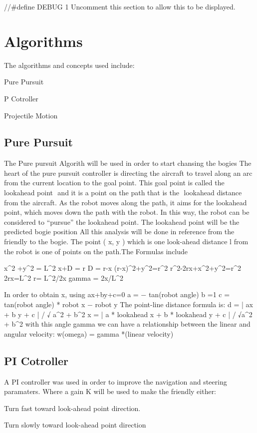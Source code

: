 \begin{DoxyVerb}//#define DEBUG 1
Uncomment this section to allow this to be displayed.\end{DoxyVerb}
\hypertarget{index_Algorithms}{}\section{Algorithms}\label{index_Algorithms}
The algorithms and concepts used include\+:
\begin{DoxyItemize}
\item Pure Pursuit
\item P Cotroller
\item Projectile Motion
\end{DoxyItemize}\hypertarget{index_ac_doc_}{}\subsection{Pure Pursuit}\label{index_ac_doc_}
The Pure pursuit Algorith will be used in order to start chansing the bogies The heart of the pure pursuit controller is directing the aircraft to travel along an arc from the current location to the goal point. This goal point is called the ​ lookahead point ​ and it is a point on the path that is the ​ lookahead distance from the aircraft. As the robot moves along the path, it aims for the lookahead point, which moves down the path with the robot. In this way, the robot can be considered to “pursue” the lookahead point. The lookahead point will be the predicted bogie position All this analysis will be done in reference from the friendly to the bogie. The point ( x, y ) which is one look-\/ahead distance l from the robot is one of points on the path.\+The Formulas include \begin{DoxyVerb}  x^2 +y^2 = L^2
  x+D = r
  D = r-x
  (r-x)^2+y^2=r^2
  r^2-2rx+x^2+y^2=r^2
  2rx=L^2
  r= L^2/2x
  gamma = 2x/L^2

  In order to obtain x, using ax+by+c=0
 a = − tan(robot angle)
 b =1
 c = tan(robot angle) * robot x − robot y
 The point-line distance formula is:
 d = | ax + b y + c | / √ {a^2 + b^2}
 x = | a * lookahead x + b * lookahead y + c | / √{a^2 + b^2}
 with this angle gamma we can have a relationship between the linear and angular velocity:
 w(omega) = gamma *(linear velocity)
\end{DoxyVerb}
\hypertarget{index_ac_doc_PI_Cotroller}{}\subsection{P\+I Cotroller}\label{index_ac_doc_PI_Cotroller}
A PI controller was used in order to improve the navigation and steering paramaters. Where a gain K will be used to make the friendly either\+:
\begin{DoxyItemize}
\item Turn fast toward look-\/ahead point direction.
\item Turn slowly toward look-\/ahead point direction
\end{DoxyItemize}

